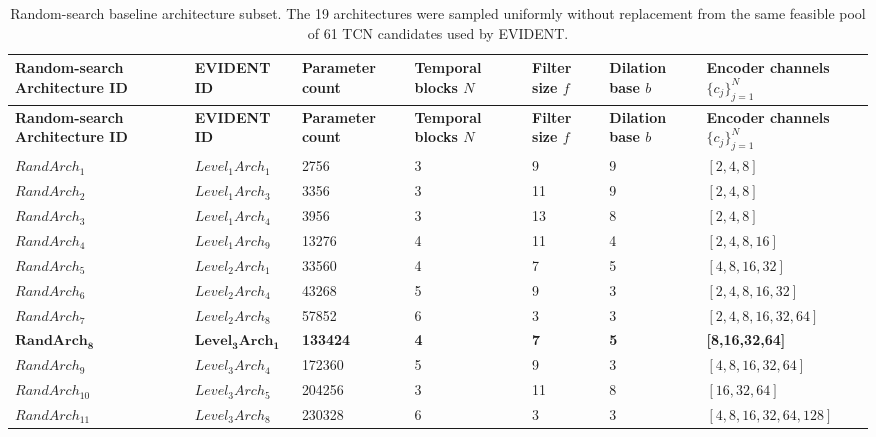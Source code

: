\documentclass[preprint,12pt]{elsarticle}
\begin{document}
\begin{footnotesize}
\setlength{\tabcolsep}{4pt}
\renewcommand{\arraystretch}{1.3}
\begin{longtable}{p{3.0cm}p{2.0cm}p{1.8cm}p{1.7cm}p{1.3cm}p{1.4cm}p{2.2cm}}
\caption{Random-search baseline architecture subset. The 19 architectures were sampled uniformly without replacement from the same feasible pool of 61 TCN candidates used by EVIDENT.}
\label{tab:random}\\
\toprule
\textbf{Random-search Architecture ID} &
\textbf{EVIDENT ID} &
\textbf{Parameter count} &
\textbf{Temporal blocks $N$} &
\textbf{Filter size $f$} &
\textbf{Dilation base $b$} &
\textbf{Encoder channels $\{c_j\}_{j=1}^{N}$} \\
\midrule
\endfirsthead

\toprule
\textbf{Random-search Architecture ID} &
\textbf{EVIDENT ID} &
\textbf{Parameter count} &
\textbf{Temporal blocks $N$} &
\textbf{Filter size $f$} &
\textbf{Dilation base $b$} &
\textbf{Encoder channels $\{c_j\}_{j=1}^{N}$} \\
\midrule
\endhead

\endfoot

\bottomrule
\endlastfoot

$RandArch_1$     & $Level_1Arch_1$     & 2756     & 3 & 9  & 9 & $[2, 4, 8]$ \\
$RandArch_2$     & $Level_1Arch_3$     & 3356     & 3 & 11 & 9 & $[2, 4, 8]$ \\
$RandArch_3$     & $Level_1Arch_4$     & 3956     & 3 & 13 & 8 & $[2, 4, 8]$ \\
$RandArch_4$     & $Level_1Arch_9$     & 13276    & 4 & 11 & 4 & $[2, 4, 8, 16]$ \\

$RandArch_5$     & $Level_2Arch_1$     & 33560    & 4 & 7  & 5 & $[4, 8, 16, 32]$ \\
$RandArch_6$     & $Level_2Arch_4$     & 43268    & 5 & 9  & 3 & $[2, 4, 8, 16, 32]$ \\
$RandArch_7$     & $Level_2Arch_8$     & 57852    & 6 & 3  & 3 & $[2, 4, 8, 16, 32, 64]$ \\

$\mathbf{RandArch_8}$ & $\mathbf{Level_3Arch_1}$ & \textbf{133424} & \textbf{4} & \textbf{7} & \textbf{5} & \textbf{[8,16,32,64]} \\
$RandArch_9$     & $Level_3Arch_4$     & 172360   & 5 & 9  & 3 & $[4, 8, 16, 32, 64]$ \\
$RandArch_{10}$  & $Level_3Arch_5$     & 204256   & 3 & 11 & 8 & $[16, 32, 64]$ \\
$RandArch_{11}$  & $Level_3Arch_8$     & 230328   & 6 & 3  & 3 & $[4, 8, 16, 32, 64, 128]$ \\


\end{longtable}
\end{footnotesize}
\end{document}
